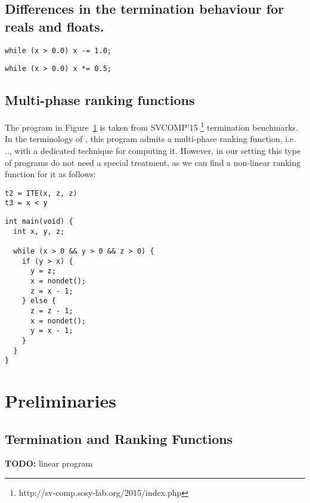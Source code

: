 \documentclass[preprint]{sigplanconf}
\theoremstyle{definition}
\newcommand{\todo}[1]{{\bf TODO:} #1}
\begin{document}
\subsection{Differences in the termination behaviour for reals and floats.}
\begin{lstlisting}
while (x > 0.0) x -= 1.0;
\end{lstlisting}

\begin{lstlisting}
while (x > 0.0) x *= 0.5;
\end{lstlisting}


\subsection{Multi-phase ranking functions}
The program in Figure~\ref{} is taken from SVCOMP'15  \footnote{http://sv-comp.sosy-lab.org/2015/index.php} termination benchmarks.
In the terminology of \cite{DBLP:conf/tacas/LeikeH14}, this program admits a multi-phase ranking function, i.e. ..,  with a dedicated technique for computing it. However, in our setting 
this type of programs do not need a special treatment, as we can find a non-linear ranking function for it as follows:
\begin{verbatim}
t2 = ITE(x, z, z)
t3 = x < y
\end{verbatim}


\begin{lstlisting}
int main(void) {
  int x, y, z;

  while (x > 0 && y > 0 && z > 0) {
    if (y > x) {
      y = z;
      x = nondet();
      z = x - 1;
    } else {
      z = z - 1;
      x = nondet();
      y = x - 1;
    }
  }
}
\end{lstlisting}



\section{Preliminaries}
\subsection{Termination and Ranking Functions} \label{sec:ranking.functions}
\todo{linear program}
\end{document}

